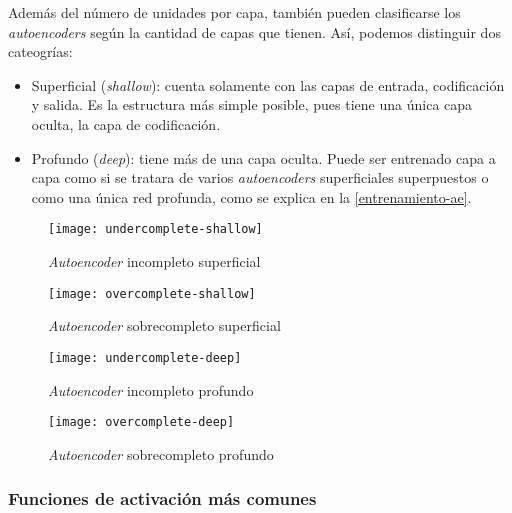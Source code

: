 Además del número de unidades por capa, también pueden clasificarse los \textit{autoencoders} según la cantidad de capas que tienen. Así, podemos distinguir dos cateogrías:

\begin{itemize}
\item Superficial (\textit{shallow}): cuenta solamente con las capas de entrada, codificación y salida. Es la estructura más simple posible, pues tiene una única capa oculta, la capa de codificación.
\item Profundo (\textit{deep}): tiene más de una capa oculta. Puede ser entrenado capa a capa como si se tratara de varios \textit{autoencoders} superficiales superpuestos o como una única red profunda, como se explica en la \autoref{entrenamiento-ae}.
\end{itemize}

\begin{figure}
    \centering
    \begin{minipage}{0.45\textwidth}
        \centering
        \texttt{[image: undercomplete-shallow]}
        \caption{\textit{Autoencoder} incompleto superficial}
    \end{minipage}\hfill
    \begin{minipage}{0.45\textwidth}
        \centering
        \texttt{[image: overcomplete-shallow]}
        \caption{\textit{Autoencoder} sobrecompleto superficial}
    \end{minipage}
\end{figure}

\begin{figure}
    \centering
    \begin{minipage}{0.45\textwidth}
        \centering
        \texttt{[image: undercomplete-deep]}
        \caption{\textit{Autoencoder} incompleto profundo}
    \end{minipage}\hfill
    \begin{minipage}{0.45\textwidth}
        \centering
        \texttt{[image: overcomplete-deep]}
        \caption{\textit{Autoencoder} sobrecompleto profundo}
    \end{minipage}
\end{figure}

\subsubsection{Funciones de activación más comunes}

